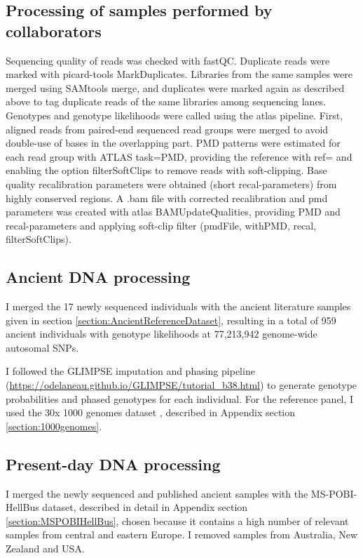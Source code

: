 \subsection{Processing of samples performed by collaborators}

Sequencing quality of reads was checked with fastQC. Duplicate reads were marked with picard-tools MarkDuplicates. Libraries from the same samples were merged using SAMtools merge, and duplicates were marked again as described above to tag duplicate reads of the same libraries among sequencing lanes. Genotypes and genotype likelihoods were called using the atlas pipeline. First, aligned reads from paired-end sequenced read groups were merged to avoid double-use of bases in the overlapping part. PMD patterns were estimated for each read group with ATLAS task=PMD, providing the reference with ref= and enabling the option filterSoftClips to remove reads with soft-clipping. 
Base quality recalibration parameters were obtained (short recal-parameters) from highly conserved regions. A .bam file with corrected recalibration and pmd parameters was created with atlas BAMUpdateQualities, providing PMD and recal-parameters and applying soft-clip filter (pmdFile, withPMD, recal, filterSoftClips).

\subsection{Ancient DNA processing} \label{AncientDNAprocessing}

I merged the 17 newly sequenced individuals with the ancient literature samples given in section \ref{section:AncientReferenceDataset}, resulting in a total of 959 ancient individuals with genotype likelihoods at 77,213,942 genome-wide autosomal SNPs. 

I followed the GLIMPSE \cite{rubinacci2021efficient} imputation and phasing pipeline (\url{https://odelaneau.github.io/GLIMPSE/tutorial_b38.html}) to generate genotype probabilities and phased genotypes for each individual. For the reference panel, I used the 30x 1000 genomes dataset \cite{byrska2021high}, described in Appendix section \ref{section:1000genomes}.  

\subsection{Present-day DNA processing} \label{PresentdayDNAprocessing}

I  merged the newly sequenced and published ancient samples with the MS-POBI-HellBus dataset, described in detail in Appendix section \ref{section:MSPOBIHellBus}, chosen because it contains a high number of relevant samples from central and eastern Europe. I removed samples from Australia, New Zealand and USA.

